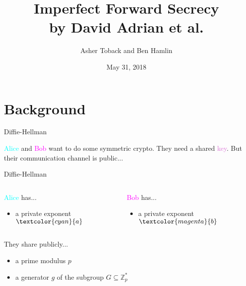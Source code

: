 \documentclass[presentation, aspectratio=54]{beamer}
\author{Asher Toback and Ben Hamlin}
\date{May 31, 2018}
\title{Imperfect Forward Secrecy \\ by David Adrian et al.}
\newcommand{\cyan}[1]{\textcolor{cyan}{#1}}
\newcommand{\magenta}[1]{\textcolor{magenta}{#1}}
\newcommand{\purple}[1]{\textcolor{orchid}{#1}}
\begin{document}
\maketitle
\section{Background}


\begin{frame}{Diffie-Hellman}

\cyan{Alice} and \magenta{Bob} want to do some symmetric crypto. They need a
shared \purple{key}. But their communication channel is public...

\end{frame}


\begin{frame}{Diffie-Hellman}

\begin{columns}
\begin{column}{0.5\textwidth}
\cyan{Alice} has...
\begin{itemize}
\item a private exponent $\cyan{a}$
\end{itemize}
\end{column}\hfill
\begin{column}{0.5\textwidth}
\magenta{Bob} has...
\begin{itemize}
\item a private exponent $\magenta{b}$
\end{itemize}
\end{column}
\end{columns}
\vspace{20pt}
They share publicly...
\begin{itemize}
\item a prime modulus $p$
\item a generator $g$ of the subgroup $G \subseteq \mathbb{Z}^*_p$
\end{itemize}

\end{frame}

\end{document}
